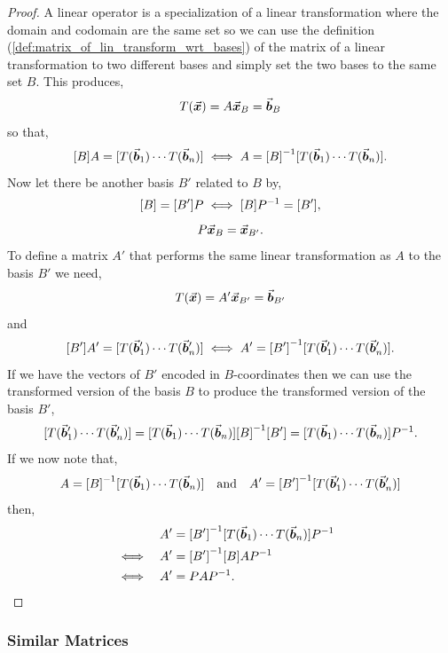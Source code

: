 \documentclass[MathsNotesBase.tex]{subfiles}
\begin{document}
{		
		\bigskip
		\begin{proof}
			A linear operator is a specialization of a linear transformation where the domain and codomain are the same set so we can use the definition (\ref{def:matrix_of_lin_transform_wrt_bases}) of the matrix of a linear transformation \wrt to two different bases and simply set the two bases to the same set $B$. This produces,
			\[ T(\vec{\bm{x}}) = A\vec{\bm{x}}_B = \vec{\bm{b}}_B \]
			so that,
			\[ [B]A = [T(\vec{\bm{b}}_1) \cdots T(\vec{\bm{b}}_n)] \iff A = {[B]}^{-1}[T(\vec{\bm{b}}_1) \cdots T(\vec{\bm{b}}_n)]. \]		
			Now let there be another basis $B'$ related to $B$ by,
			\[ [B] = [B']P \iff [B]{P}^{-1} = [B'], \]
			\[ P\vec{\bm{x}}_B = \vec{\bm{x}}_{B'}. \]
			To define a matrix $A'$ that performs the same linear transformation as $A$ \wrt to the basis $B'$ we need,
			\[ T(\vec{\bm{x}}) = A'\vec{\bm{x}}_{B'} = \vec{\bm{b}}_{B'} \]
			and
			\[ [B']A' = [T(\vec{\bm{b}}_1') \cdots T(\vec{\bm{b}}_n')] \iff A' = {[B']}^{-1}[T(\vec{\bm{b}}_1') \cdots T(\vec{\bm{b}}_n')]. \]
			If we have the vectors of $B'$ encoded in $B$-coordinates then we can use the transformed version of the basis $B$ to produce the transformed version of the basis $B'$,
			\[ [T(\vec{\bm{b}}_1') \cdots T(\vec{\bm{b}}_n')] = [T(\vec{\bm{b}}_1) \cdots T(\vec{\bm{b}}_n)]{[B]}^{-1}[B'] = [T(\vec{\bm{b}}_1) \cdots T(\vec{\bm{b}}_n)]{P}^{-1}. \]
			If we now note that,
			\[ A = {[B]}^{-1}[T(\vec{\bm{b}}_1) \cdots T(\vec{\bm{b}}_n)] \hspace{10pt}\text{and}\hspace{10pt} A' = {[B']}^{-1}[T(\vec{\bm{b}}_1') \cdots T(\vec{\bm{b}}_n')]  \]
			then,
			\begin{align*}
			&& A' &= {[B']}^{-1}[T(\vec{\bm{b}}_1) \cdots T(\vec{\bm{b}}_n)]{P}^{-1} \\
			&\iff & A' &= {[B']}^{-1}[B]A{P}^{-1} &\text{\scriptsize{}} \\
			&\iff & A' &= PA{P}^{-1}. &\text{\scriptsize{}} \qedhere
			\end{align*}
		\end{proof}
	
		\bigskip
		\subsubsection{Similar Matrices}
		\bigskip
		\medskip
		
}
\end{document}
